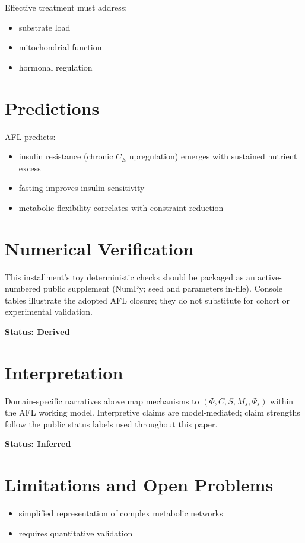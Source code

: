 \documentclass[12pt,a4paper]{article}
\begin{document}
Effective treatment must address:

\begin{itemize}
    \item substrate load
    \item mitochondrial function
    \item hormonal regulation
\end{itemize}

\section{Predictions}

AFL predicts:

\begin{itemize}
    \item insulin resistance (chronic $C_E$ upregulation) emerges with sustained nutrient excess
    \item fasting improves insulin sensitivity
    \item metabolic flexibility correlates with constraint reduction
\end{itemize}

\section{Numerical Verification}
This installment's toy deterministic checks should be packaged as an active-numbered public supplement (NumPy; seed and parameters in-file). Console tables illustrate the adopted AFL closure; they do not substitute for cohort or experimental validation.

\textbf{Status: Derived}

\section{Interpretation}
Domain-specific narratives above map mechanisms to $(\Phi, C, S, M_s, \Psi_s)$ within the AFL working model. Interpretive claims are model-mediated; claim strengths follow the public status labels used throughout this paper.

\textbf{Status: Inferred}

\section{Limitations and Open Problems}

\begin{itemize}
    \item simplified representation of complex metabolic networks
    \item requires quantitative validation
\end{itemize}
\end{document}
